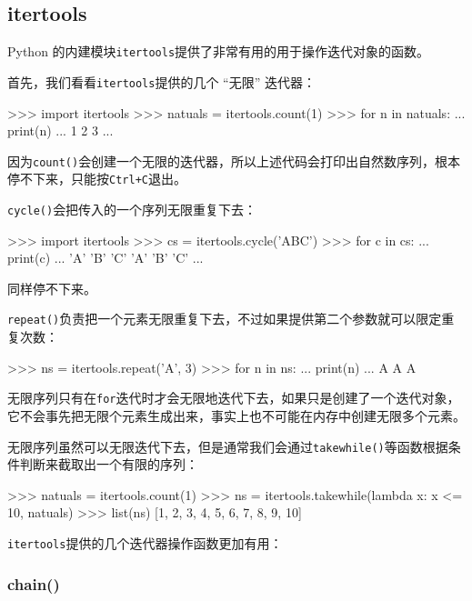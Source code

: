 \hypertarget{itertools}{%
\subsection{itertools}\label{itertools}}

Python
的内建模块\texttt{itertools}提供了非常有用的用于操作迭代对象的函数。

首先，我们看看\texttt{itertools}提供的几个 ``无限'' 迭代器：

\begin{pythoncode}
>>> import itertools
>>> natuals = itertools.count(1)
>>> for n in natuals:
...     print(n)
...
1
2
3
...
\end{pythoncode}

因为\texttt{count()}会创建一个无限的迭代器，所以上述代码会打印出自然数序列，根本停不下来，只能按\texttt{Ctrl+C}退出。

\texttt{cycle()}会把传入的一个序列无限重复下去：

\begin{pythoncode}
>>> import itertools
>>> cs = itertools.cycle('ABC') 
>>> for c in cs:
...     print(c)
...
'A'
'B'
'C'
'A'
'B'
'C'
...
\end{pythoncode}

同样停不下来。

\texttt{repeat()}负责把一个元素无限重复下去，不过如果提供第二个参数就可以限定重复次数：

\begin{pythoncode}
>>> ns = itertools.repeat('A', 3)
>>> for n in ns:
...     print(n)
...
A
A
A
\end{pythoncode}

无限序列只有在\texttt{for}迭代时才会无限地迭代下去，如果只是创建了一个迭代对象，它不会事先把无限个元素生成出来，事实上也不可能在内存中创建无限多个元素。

无限序列虽然可以无限迭代下去，但是通常我们会通过\texttt{takewhile()}等函数根据条件判断来截取出一个有限的序列：

\begin{pythoncode}
>>> natuals = itertools.count(1)
>>> ns = itertools.takewhile(lambda x: x <= 10, natuals)
>>> list(ns)
[1, 2, 3, 4, 5, 6, 7, 8, 9, 10]
\end{pythoncode}

\texttt{itertools}提供的几个迭代器操作函数更加有用：

\hypertarget{chain}{%
\subsubsection{chain()}\label{chain}}

